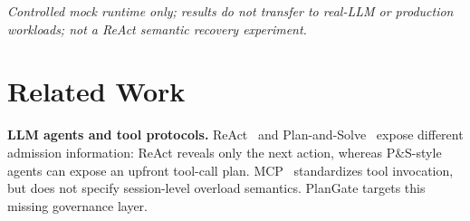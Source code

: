 \documentclass[sigconf,review,anonymous]{acmart}
\begin{document}
\begin{table}[t]
\centering
\caption{Controlled runtime recovery evaluation under injected recoverable failures
  (\textit{failure\_rate}$\,{=}\,0.3$, $S{=}50$ sessions, $N{=}5$ steps, failure injected at step~2,
  5 independent seeds; P\&S mode only; mock handlers, no real LLM).
  \emph{Recovered} = sessions rescued via checkpoint resume per run.
  \emph{Waste Steps} = tool-call steps that do not contribute to the final successful trajectory,
  including discarded prefix work and failed interrupted calls.
  \emph{Avoided Replay} = steps saved by PlanGate-R relative to naive retry (mean over seeds).}
\label{tab:plangate_r_recovery}
\small
{}
\vspace{-0.3em}
{\footnotesize \textit{Controlled mock runtime only; results do not transfer to real-LLM or production workloads; not a ReAct semantic recovery experiment.}}
\end{table}


\section{Related Work}

\textbf{LLM agents and tool protocols.} ReAct~\cite{react} and Plan-and-Solve~\cite{planandsolve} expose different admission information: ReAct reveals only the next action, whereas P\&S-style agents can expose an upfront tool-call plan. MCP~\cite{mcp2024} standardizes tool invocation, but does not specify session-level overload semantics. PlanGate targets this missing governance layer.
\end{document}
